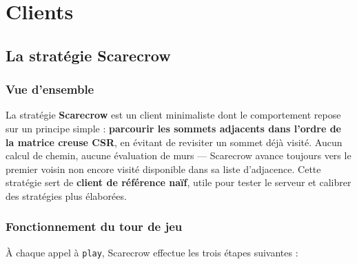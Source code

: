 \documentclass[12pt,a4paper]{article}
\begin{document}
\section{Clients}
\label{sec:client}

\subsection{La stratégie Scarecrow}

\subsubsection{Vue d'ensemble}

La stratégie \textbf{Scarecrow} est un client minimaliste dont le comportement
repose sur un principe simple : \textbf{parcourir les sommets adjacents dans
l'ordre de la matrice creuse CSR}, en évitant de revisiter un sommet déjà
visité. Aucun calcul de chemin, aucune évaluation de murs — Scarecrow avance
toujours vers le premier voisin non encore visité disponible dans sa liste
d'adjacence. Cette stratégie sert de \textbf{client de référence naïf},
utile pour tester le serveur et calibrer des stratégies plus élaborées.


\subsubsection{Fonctionnement du tour de jeu}

À chaque appel à \texttt{play}, Scarecrow effectue les trois étapes suivantes :
\end{document}
